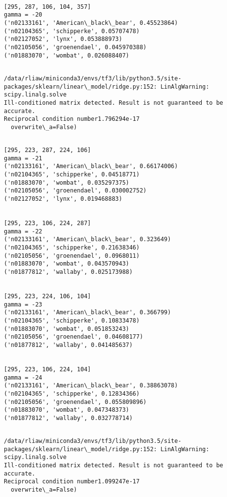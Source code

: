 \documentclass[11pt]{article}
\begin{document}
    \begin{Verbatim}[commandchars=\\\{\}]

[295, 287, 106, 104, 357]
gamma = -20
('n02133161', 'American\_black\_bear', 0.45523864)
('n02104365', 'schipperke', 0.05707478)
('n02127052', 'lynx', 0.053888973)
('n02105056', 'groenendael', 0.045970388)
('n01883070', 'wombat', 0.026088407)


    \end{Verbatim}

    \begin{Verbatim}[commandchars=\\\{\}]
/data/rliaw/miniconda3/envs/tf3/lib/python3.5/site-packages/sklearn/linear\_model/ridge.py:152: LinAlgWarning: scipy.linalg.solve
Ill-conditioned matrix detected. Result is not guaranteed to be accurate.
Reciprocal condition number1.796294e-17
  overwrite\_a=False)

    \end{Verbatim}

    \begin{Verbatim}[commandchars=\\\{\}]

[295, 223, 287, 224, 106]
gamma = -21
('n02133161', 'American\_black\_bear', 0.66174006)
('n02104365', 'schipperke', 0.04518771)
('n01883070', 'wombat', 0.035297375)
('n02105056', 'groenendael', 0.030002752)
('n02127052', 'lynx', 0.019468883)


[295, 223, 106, 224, 287]
gamma = -22
('n02133161', 'American\_black\_bear', 0.323649)
('n02104365', 'schipperke', 0.21638346)
('n02105056', 'groenendael', 0.0968011)
('n01883070', 'wombat', 0.043570943)
('n01877812', 'wallaby', 0.025173988)


[295, 223, 224, 106, 104]
gamma = -23
('n02133161', 'American\_black\_bear', 0.366799)
('n02104365', 'schipperke', 0.10833478)
('n01883070', 'wombat', 0.051853243)
('n02105056', 'groenendael', 0.04608177)
('n01877812', 'wallaby', 0.041485637)


[295, 223, 106, 224, 104]
gamma = -24
('n02133161', 'American\_black\_bear', 0.38863078)
('n02104365', 'schipperke', 0.12834366)
('n02105056', 'groenendael', 0.055809896)
('n01883070', 'wombat', 0.047348373)
('n01877812', 'wallaby', 0.032778714)


    \end{Verbatim}

    \begin{Verbatim}[commandchars=\\\{\}]
/data/rliaw/miniconda3/envs/tf3/lib/python3.5/site-packages/sklearn/linear\_model/ridge.py:152: LinAlgWarning: scipy.linalg.solve
Ill-conditioned matrix detected. Result is not guaranteed to be accurate.
Reciprocal condition number1.099247e-17
  overwrite\_a=False)

    \end{Verbatim}
\end{document}
